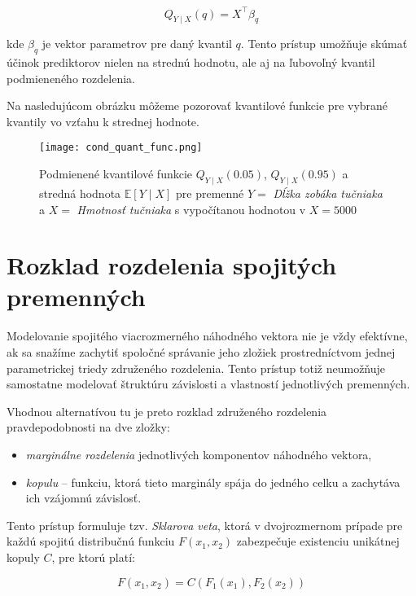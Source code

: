 \begin{equation}
Q_{Y \mid X}(q) = X^\top \beta_q
\end{equation}

kde $\beta_q$ je vektor parametrov pre daný kvantil $q$. Tento prístup umožňuje skúmať účinok prediktorov nielen na strednú hodnotu, ale aj na ľubovoľný kvantil podmieneného rozdelenia.

Na nasledujúcom obrázku môžeme pozorovať kvantilové funkcie pre vybrané kvantily vo vzťahu k strednej hodnote.

\begin{figure}[H]
    \centering
    \texttt{[image: cond\_quant\_func.png]}
    \caption{Podmienené kvantilové funkcie $Q_{Y \mid X}(0.05)$, $Q_{Y \mid X}(0.95)$ a stredná hodnota $\mathbb{E}[Y \mid X]$ pre premenné $Y=$ \textit{Dĺžka zobáka tučniaka} a $X=$ \textit{Hmotnosť tučniaka} s vypočítanou hodnotou v $X=5000$}
    \label{fig:cond_quant_mean}
\end{figure}

\section{Rozklad rozdelenia spojitých premenných}\label{sec:rozklad_kopule}

Modelovanie spojitého viacrozmerného náhodného vektora nie je vždy efektívne, ak sa snažíme zachytiť spoločné správanie jeho zložiek prostredníctvom jednej parametrickej triedy združeného rozdelenia. Tento prístup totiž neumožňuje samostatne modelovať štruktúru závislosti a vlastností jednotlivých premenných.

Vhodnou alternatívou tu je preto rozklad združeného rozdelenia pravdepodobnosti na dve zložky:
\begin{itemize}
  \item \textit{marginálne rozdelenia} jednotlivých komponentov náhodného vektora,
  \item \textit{kopulu} – funkciu, ktorá tieto marginály spája do jedného celku a zachytáva ich vzájomnú závislosť.
\end{itemize}

Tento prístup formuluje tzv. \textit{Sklarova veta}, ktorá v dvojrozmernom prípade pre každú spojitú distribučnú funkciu $F(x_1, x_2)$ zabezpečuje existenciu unikátnej kopuly $C$, pre ktorú platí:

\begin{equation}\label{eq:copula_dist}
F(x_1, x_2) = C\left(F_1(x_1), F_2(x_2)\right)
\end{equation}

